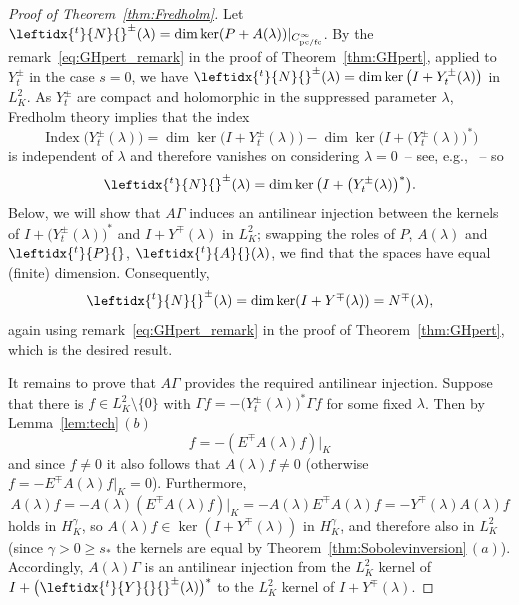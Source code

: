 \documentclass[pdftex]{sigma}
\numberwithin{equation}{section}
\newcommand{\fc}{\mathrm{fc}}
\newcommand{\pc}{\mathrm{pc}}
\newcommand{\adj}[1]{\leftidx{^{t}}{#1}{}}
\DeclareMathOperator{\Ind}{Index}
\begin{document}
 \begin{proof}[Proof of Theorem~\ref{thm:Fredholm}]
 	Let $\adj{N}^\pm(\lambda) =\dim\ker (P+A(\lambda))|_{C^\infty_{\pc/\fc}}$.
 	By the remark~\eqref{eq:GHpert_remark} in the proof of Theorem~\ref{thm:GHpert}, applied to $Y_t^\pm$ in the case $s=0$, we have $\adj{N}^\pm(\lambda) = \dim \ker \big(I+Y_t^\pm(\lambda)\big)$ in $L^2_K$. As $Y_t^\pm$ are compact and holomorphic in the suppressed parameter $\lambda$,
 	Fredholm theory implies that the index
 	\begin{equation*}
 		\Ind \big(Y_t^\pm(\lambda)\big)=
 		\dim \ker\big(I+Y_t^\pm(\lambda)\big) - \dim\ker\big(I+\big(Y_t^\pm(\lambda)\big)^*\big)
 	\end{equation*}
 	is independent of $\lambda$ and therefore vanishes on considering $\lambda=0$~-- see, e.g., \cite[Theorem~4.3.12]{Davies_LOps}~-- so
 	\begin{equation*}
 		\adj{N}^\pm(\lambda) = \dim\ker\big(I+\big(Y_t^\pm(\lambda)\big)^*\big) .
 	\end{equation*}
 	Below, we will show that $A\Gamma$ induces an antilinear injection between the kernels of
 	$I+\big(Y_t^\pm(\lambda)\big)^*$ and $I+Y^\mp(\lambda)$ in $L^2_K$; swapping the roles of $P$, $A(\lambda)$ and $\adj{P}$, $\adj{A}(\lambda)$,
 	we find that the spaces have equal (finite) dimension. Consequently,
 	\begin{equation*}
 		\adj{N}^\pm(\lambda) = \dim\ker (I+Y^\mp(\lambda)) = N^\mp(\lambda),
 	\end{equation*}
 	again using remark~\eqref{eq:GHpert_remark} in the proof of Theorem~\ref{thm:GHpert}, which is the desired result.
 	
 	It remains to prove that $A\Gamma$ provides the required antilinear injection.
 	Suppose that
 	there is $f\in L^2_K\setminus\{0\}$ with $\Gamma f=-\big(Y_t^\pm(\lambda)\big)^*\Gamma f$ for some fixed $\lambda$. Then by Lemma~\ref{lem:tech}\,$(b)$
 	\begin{equation*}
 		f = -(E^\mp A(\lambda) f) |_K
 	\end{equation*}
 	and since $f\neq 0$ it also follows that $A(\lambda)f\neq 0$ (otherwise $f=-E^\mp A(\lambda)f|_K=0$). Furthermore,
 	\begin{equation*}
 		A(\lambda) f =- A(\lambda) (E^\mp A(\lambda) f)|_K =- A(\lambda) E^\mp A(\lambda) f
 		=-Y^\mp(\lambda)A(\lambda)f
 	\end{equation*}
 	holds in $H^\gamma_K$, so $A(\lambda)f \in \ker (I+Y^\mp(\lambda))$ in $H^\gamma_K$,
 	and therefore also in $L^2_K$ (since $\gamma>0\ge s_*$ the kernels are equal by Theorem~\ref{thm:Sobolevinversion}\,$(a)$). Accordingly, $A(\lambda)\Gamma$ is an antilinear injection from the $L^2_K$ kernel of
 	$I+\big(\adj{Y}{}^\pm(\lambda)\big)^*$ to the $L^2_K$ kernel of $I+Y^\mp(\lambda)$.
 \end{proof}
\end{document}
